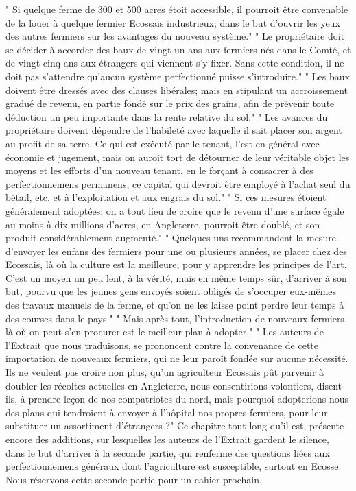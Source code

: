 " Si quelque ferme de 300 et 500 acres étoit accessible, il pourroit être convenable de la louer à quelque fermier Ecossais industrieux; dans le but d'ouvrir les yeux des autres fermiers sur les avantages du nouveau système."
" Le propriétaire doit se décider à accorder des baux de vingt-un ans aux fermiers nés dans le Comté, et de vingt-cinq ans aux étrangers qui viennent s'y fixer. Sans cette condition, il ne doit pas s'attendre qu'aucun système\setcounter{page}{425} perfectionné puisse s'introduire."
" Les baux doivent être dressés avec des clauses libérales; mais en stipulant un accroissement gradué de revenu, en partie fondé sur le prix des grains, afin de prévenir toute déduction un peu importante dans la rente relative du sol."
" Les avances du propriétaire doivent dépendre de l'habileté avec laquelle il sait placer son argent au profit de sa terre. Ce qui est exécuté par le tenant, l'est en général avec économie et jugement, mais on auroit tort de détourner de leur véritable objet les moyens et les efforts d'un nouveau tenant, en le forçant à consacrer à des perfectionnemens permanens, ce capital qui devroit être employé à l'achat seul du bétail, etc. et à l'exploitation et aux engrais du sol."
" Si ces mesures étoient généralement adoptées; on a tout lieu de croire que le revenu d'une surface égale au moins à dix millions d'acres, en Angleterre, pourroit être doublé, et son produit considérablement augmenté."
" Quelques-uns recommandent la mesure d'envoyer les enfans des fermiers pour une ou plusieurs années, se placer chez des Ecossais, là où la culture est la meilleure,\setcounter{page}{426} pour y apprendre les principes de l'art. C'est un moyen un peu lent, à la vérité, mais en même temps sûr, d'arriver à son but, pourvu que les jeunes gens envoyés soient obligés de s'occuper eux-mêmes des travaux manuels de la ferme, et qu'on ne les laisse point perdre leur temps à des courses dans le pays."
" Mais après tout, l'introduction de nouveaux fermiers, là où on peut s'en procurer est le meilleur plan à adopter."
" Les auteurs de l'Extrait que nous traduisons, se prononcent contre la convenance de cette importation de nouveaux fermiers, qui ne leur paroît fondée sur aucune nécessité. Ils ne veulent pas croire non plus, qu'un agriculteur Ecossais pût parvenir à doubler les récoltes actuelles en Angleterre, nous consentirions volontiers, disent-ils, à prendre leçon de nos compatriotes du nord, mais pourquoi adopterions-nous des plans qui tendroient à envoyer à l'hôpital nos propres fermiers, pour leur substituer un assortiment d'étrangers ?"
Ce chapitre tout long qu'il est, présente encore des additions, sur lesquelles les auteurs de l'Extrait gardent le silence, dans le but d'arriver à la seconde partie, qui renferme des questions liées aux perfectionnemens généraux\setcounter{page}{427} dont l'agriculture est susceptible, surtout en Ecosse. Nous réservons cette seconde partie pour un cahier prochain.